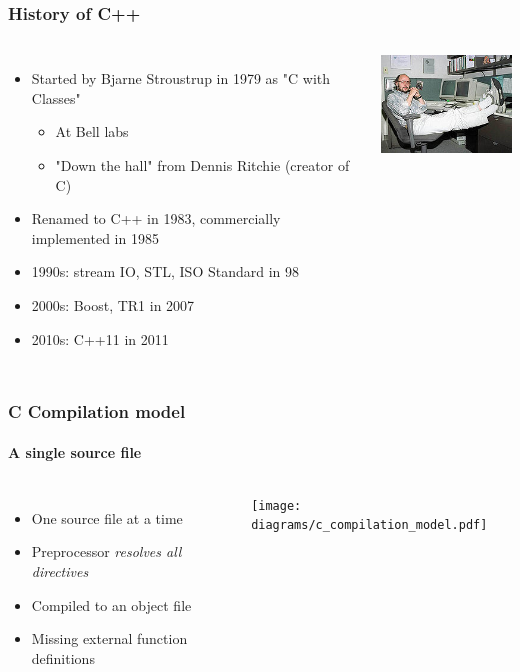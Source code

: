 \documentclass[table]{beamer}
\newcommand{\declarelesson}{\textbf{\color{themegreen}{Lesson:}} }
\begin{document}
\begin{frame}
    \frametitle{\declarelesson History of C++}
    \begin{columns}[t]
        \column{7cm}
        \begin{itemize}
            \item<1->Started by Bjarne Stroustrup in 1979 as "C with Classes"
                \begin{itemize}
                    \item At Bell labs
                    \item "Down the hall" from Dennis Ritchie (creator of C)
                \end{itemize}
            \item<1->Renamed to C++ in 1983, commercially implemented in 1985
            \item<2->1990s: stream IO, STL, ISO Standard in 98
            \item<3->2000s: Boost, TR1 in 2007
            \item<4->2010s: C++11 in 2011
        \end{itemize}
        \column[T]{4cm}
        \includegraphics[width=4cm]{220px-BjarneStroustrup.jpg}
    \end{columns}
\end{frame}

\begin{frame}
    \frametitle{\declarelesson C Compilation model}
    \framesubtitle{A single source file}
    \begin{columns}[t]
        \column{4cm}
        \begin{itemize}
            \item One source file at a time
            \item Preprocessor \emph{resolves all directives}
            \item Compiled to an object file
            \item Missing external function definitions
        \end{itemize}
        \column[T]{8cm}
        \texttt{[image: diagrams/c\_compilation\_model.pdf]}
    \end{columns}
\end{frame}
\end{document}
